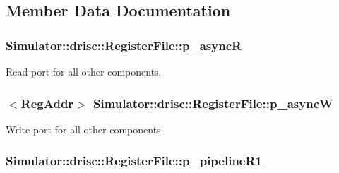 \subsection{Member Data Documentation}
\hypertarget{class_simulator_1_1drisc_1_1_register_file_ab5b6ece9e724537c995b59afa274967c}{
\subsubsection[{p\+\_\+async\+R}]{ Simulator\+::drisc\+::\+Register\+File\+::p\+\_\+async\+R}}\label{class_simulator_1_1drisc_1_1_register_file_ab5b6ece9e724537c995b59afa274967c}


Read port for all other components. 

\hypertarget{class_simulator_1_1drisc_1_1_register_file_a7adb708606bceb4b22dffe33a0563278}{
\subsubsection[{p\+\_\+async\+W}]{$<${\bf Reg\+Addr}$>$ Simulator\+::drisc\+::\+Register\+File\+::p\+\_\+async\+W}}\label{class_simulator_1_1drisc_1_1_register_file_a7adb708606bceb4b22dffe33a0563278}


Write port for all other components. 

\hypertarget{class_simulator_1_1drisc_1_1_register_file_a27f622eaade2cd9091b373e4edb24e41}{
\subsubsection[{p\+\_\+pipeline\+R1}]{ Simulator\+::drisc\+::\+Register\+File\+::p\+\_\+pipeline\+R1}}\label{class_simulator_1_1drisc_1_1_register_file_a27f622eaade2cd9091b373e4edb24e41}


